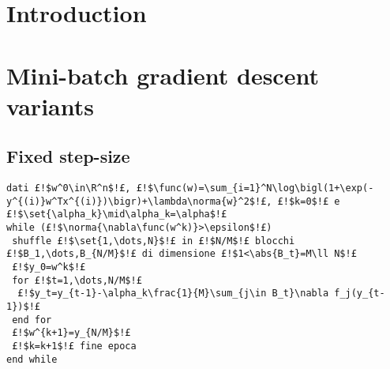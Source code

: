 \section{Introduction}\label{sc:intro}



\section{Mini-batch gradient descent variants}

\subsection{Fixed step-size}

\begin{lstlisting}[style=simple,title={Mini-batch Gradient Descent with fixed step-size}]
dati £!$w^0\in\R^n$!£, £!$\func(w)=\sum_{i=1}^N\log\bigl(1+\exp(-y^{(i)}w^Tx^{(i)})\bigr)+\lambda\norma{w}^2$!£, £!$k=0$!£ e £!$\set{\alpha_k}\mid\alpha_k=\alpha$!£
while (£!$\norma{\nabla\func(w^k)}>\epsilon$!£)
 shuffle £!$\set{1,\dots,N}$!£ in £!$N/M$!£ blocchi £!$B_1,\dots,B_{N/M}$!£ di dimensione £!$1<\abs{B_t}=M\ll N$!£
 £!$y_0=w^k$!£
 for £!$t=1,\dots,N/M$!£
  £!$y_t=y_{t-1}-\alpha_k\frac{1}{M}\sum_{j\in B_t}\nabla f_j(y_{t-1})$!£
 end for
 £!$w^{k+1}=y_{N/M}$!£
 £!$k=k+1$!£ fine epoca
end while
\end{lstlisting}




